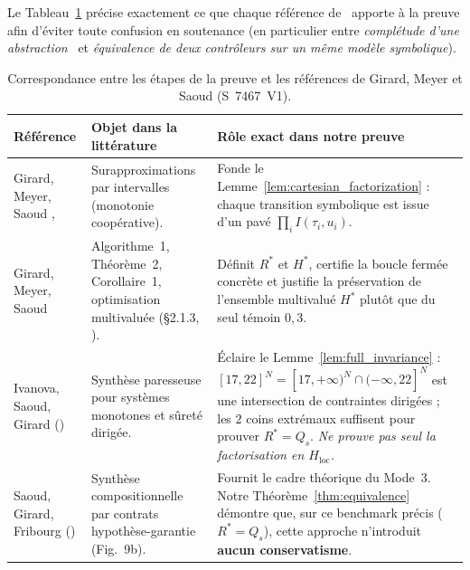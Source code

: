 \documentclass[11pt,a4paper]{article}
\theoremstyle{definition}
\theoremstyle{plain}
\begin{document}
Le Tableau~\ref{tab:refs} précise exactement ce que chaque référence de~\cite{girard2024} apporte à la preuve afin d'éviter toute confusion en soutenance (en particulier entre \emph{complétude d'une abstraction}~\cite[§4.2]{girard2024} et \emph{équivalence de deux contrôleurs sur un même modèle symbolique}).

\begin{table}[htbp]
  \centering
  \renewcommand{\arraystretch}{1.22}
  \small
  \begin{tabular}{@{}>{\raggedright\arraybackslash}p{3.6cm} >{\raggedright\arraybackslash}p{4.3cm} >{\raggedright\arraybackslash}p{7.6cm}@{}}
    \toprule
    \textbf{Référence} & \textbf{Objet dans la littérature} & \textbf{Rôle exact dans notre preuve} \\
    \midrule
    Girard, Meyer, Saoud \cite[§1.1.3]{girard2024}, \cite{angeli2003,meyer2021} &
    Surapproximations par intervalles (monotonie coopérative). &
    Fonde le Lemme~\ref{lem:cartesian_factorization} : chaque transition symbolique est issue d'un pavé $\prod_i I(\tau_i, u_i)$. \\
    Girard, Meyer, Saoud \cite[§2.1]{girard2024} &
    Algorithme~1, Théorème~2, Corollaire~1, optimisation multivaluée (§2.1.3, \cite{meyer2015}). &
    Définit $R^*$ et $H^*$, certifie la boucle fermée concrète et justifie la préservation de l'ensemble multivalué $H^*$ plutôt que du seul témoin $0{,}3$. \\
    Ivanova, Saoud, Girard \cite{ivanova2022} (\cite[§4.1.2, réf.~20]{girard2024}) &
    Synthèse paresseuse pour systèmes monotones et sûreté dirigée. &
    Éclaire le Lemme~\ref{lem:full_invariance} : $[17, 22]^N = [17, +\infty)^N \cap (-\infty, 22]^N$ est une intersection de contraintes dirigées ; les $2$ coins extrémaux suffisent pour prouver $R^* = Q_s$. \emph{Ne prouve pas seul la factorisation en $H_{\mathrm{loc}}$.} \\
    Saoud, Girard, Fribourg \cite{saoud2020} (\cite[§4.1.4, réf.~31]{girard2024}) &
    Synthèse compositionnelle par contrats hypothèse-garantie (Fig.~9b). &
    Fournit le cadre théorique du Mode~3. Notre Théorème~\ref{thm:equivalence} démontre que, sur ce benchmark précis ($R^* = Q_s$), cette approche n'introduit \textbf{aucun conservatisme}. \\
    \bottomrule
  \end{tabular}
  \caption{Correspondance entre les étapes de la preuve et les références de Girard, Meyer et Saoud (S~7467~V1).}
  \label{tab:refs}
\end{table}
\end{document}
